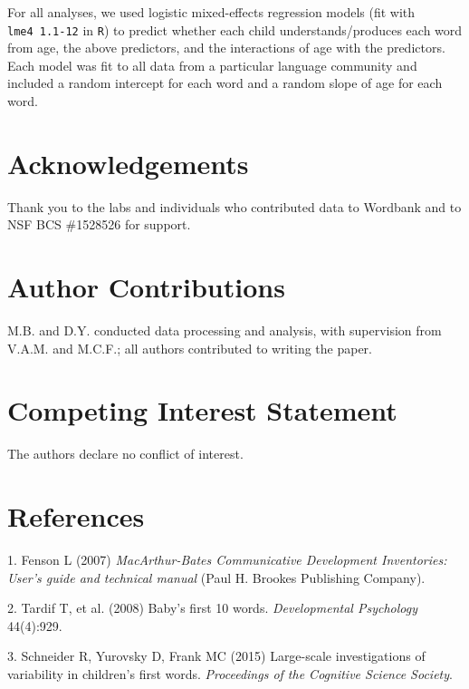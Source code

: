 \documentclass[english,man]{apa6}
\newcounter{author}
\theoremstyle{definition}
\theoremstyle{definition}
\theoremstyle{definition}
\theoremstyle{remark}
\begin{document}
For all analyses, we used logistic mixed-effects regression models (fit
with \texttt{lme4\ 1.1-12} in \texttt{R}) to predict whether each child
understands/produces each word from age, the above predictors, and the
interactions of age with the predictors. Each model was fit to all data
from a particular language community and included a random intercept for
each word and a random slope of age for each word.

\newpage

\section{Acknowledgements}\label{acknowledgements}

Thank you to the labs and individuals who contributed data to Wordbank
and to NSF BCS \#1528526 for support.

\section{Author Contributions}\label{author-contributions}

M.B. and D.Y. conducted data processing and analysis, with supervision
from V.A.M. and M.C.F.; all authors contributed to writing the paper.

\section{Competing Interest
Statement}\label{competing-interest-statement}

The authors declare no conflict of interest.

\newpage

\section{References}\label{references}

\setlength{\parindent}{-0.5in} \setlength{\leftskip}{0.5in}

\hypertarget{refs}{}
\hypertarget{ref-fenson2007}{}
1. Fenson L (2007) \emph{MacArthur-Bates Communicative Development
Inventories: User's guide and technical manual} (Paul H. Brookes
Publishing Company).

\hypertarget{ref-tardif2008}{}
2. Tardif T, et al. (2008) Baby's first 10 words. \emph{Developmental
Psychology} 44(4):929.

\hypertarget{ref-schneider2015}{}
3. Schneider R, Yurovsky D, Frank MC (2015) Large-scale investigations
of variability in children's first words. \emph{Proceedings of the
Cognitive Science Society}.
\end{document}
